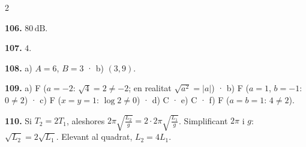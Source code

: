 \documentclass[13pt,a4paper]{extarticle}
\begin{document}
\begin{multicols}{2}
\par\noindent\begin{minipage}{\linewidth}
\textbf{106.} $80\,\text{dB}$.\par
\end{minipage}\par\vspace{1.6mm}
\par\noindent\begin{minipage}{\linewidth}
\textbf{107.} $4$.\par
\end{minipage}\par\vspace{1.6mm}
\par\noindent\begin{minipage}{\linewidth}
\textbf{108.} a) $A=6$, $B=3$ · b) $\left(3,9\right)$.\par
\end{minipage}\par\vspace{1.6mm}
\par\noindent\begin{minipage}{\linewidth}
\textbf{109.} a) F ($a=-2$: $\sqrt{4}=2\neq-2$; en realitat $\sqrt{a^2}=|a|$) · b) F ($a=1$, $b=-1$: $0\neq2$) · c) F ($x=y=1$: $\log2\neq0$) · d) C · e) C · f) F ($a=b=1$: $4\neq2$).\par
\end{minipage}\par\vspace{1.6mm}
\par\noindent\begin{minipage}{\linewidth}
\textbf{110.} Si $T_2=2T_1$, aleshores $2\pi\sqrt{\tfrac{L_2}{g}}=2\cdot2\pi\sqrt{\tfrac{L_1}{g}}$. Simplificant $2\pi$ i $g$: $\sqrt{L_2}=2\sqrt{L_1}$. Elevant al quadrat, $L_2=4L_1$.\par
\end{minipage}\par\vspace{1.6mm}
\end{multicols}
\end{document}
